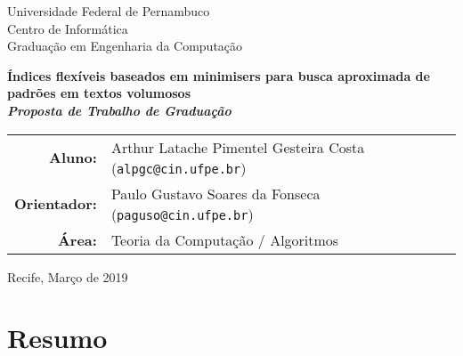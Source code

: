 \documentclass[12pt, a4paper, oneside]{article}
\begin{document}


\thispagestyle{empty}
\begin{center}
\Large
Universidade Federal de Pernambuco\\
Centro de Informática\\
Graduação em Engenharia da Computação

\vfill

{\huge \bfseries Índices flexíveis baseados em minimisers para busca aproximada de padrões em textos volumosos}
\\
\medskip
{\bfseries\itshape Proposta de Trabalho de Graduação}

\vfill

\bigskip

	\begin{tabular}{r p{100mm}}
	\textbf{Aluno: } & Arthur Latache Pimentel Gesteira Costa \newline(\texttt{alpgc@cin.ufpe.br}) \\ 
\textbf{Orientador: } & Paulo Gustavo Soares da Fonseca \newline(\texttt{paguso@cin.ufpe.br})
\\
	\textbf{Área: } & Teoria da Computação / Algoritmos
\end{tabular}

	\vspace{3cm}
Recife, Março de 2019
\end{center}

\clearpage 
\thispagestyle{empty}
\section{Resumo}
\end{document}
